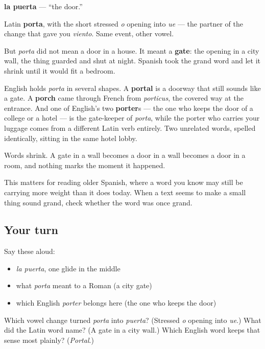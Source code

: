 \begin{cousinweb}
\textbf{la puerta} — \textquotedblleft{}the door.\textquotedblright{}

Latin \textbf{porta}, with the short stressed \emph{o} opening into \emph{ue} — the partner of the change that gave you \emph{viento}. Same event, other vowel.

But \emph{porta} did not mean a door in a house. It meant a \textbf{gate}: the opening in a city wall, the thing guarded and shut at night. Spanish took the grand word and let it shrink until it would fit a bedroom.

English holds \emph{porta} in several shapes. A \textbf{portal} is a doorway that still sounds like a gate. A \textbf{porch} came through French from \emph{porticus}, the covered way at the entrance. And one of English's two \textbf{porter}s — the one who keeps the door of a college or a hotel — is the gate-keeper of \emph{porta}, while the porter who carries your luggage comes from a different Latin verb entirely. Two unrelated words, spelled identically, sitting in the same hotel lobby.
\end{cousinweb}

\begin{grammarlens}[title={What you've built}]
Words shrink. A gate in a wall becomes a door in a wall becomes a door in a room, and nothing marks the moment it happened.

This matters for reading older Spanish, where a word you know may still be carrying more weight than it does today. When a text seems to make a small thing sound grand, check whether the word was once grand.
\end{grammarlens}

\subsection*{Your turn}
Say these aloud:

\begin{itemize}
\raggedright
  \item \emph{la puerta}, one glide in the middle
  \item what \emph{porta} meant to a Roman (a city gate)
  \item which English \emph{porter} belongs here (the one who keeps the door)
\end{itemize}

\begin{tcolorbox}[breakable,colback=teal!4,colframe=teal!35!black,title={Before you move on}]
Which vowel change turned \emph{porta} into \emph{puerta}? (Stressed \emph{o} opening into \emph{ue}.) What did the Latin word name? (A gate in a city wall.) Which English word keeps that sense most plainly? (\emph{Portal}.)
\end{tcolorbox}
